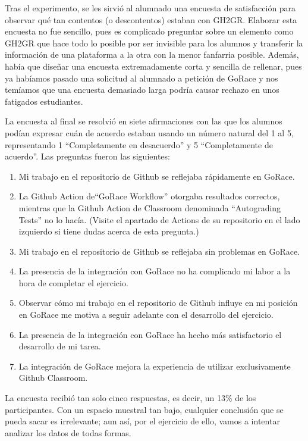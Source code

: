 Tras el experimento, se les sirvió al alumnado una encuesta de satisfacción para observar qué tan contentos (o descontentos) estaban con GH2GR. Elaborar esta encuesta no fue sencillo, pues es complicado preguntar sobre un elemento como GH2GR que hace todo lo posible por ser invisible para los alumnos y transferir la información de una plataforma a la otra con la menor fanfarria posible. Además, había que diseñar una encuesta extremadamente corta y sencilla de rellenar, pues ya habíamos pasado una solicitud al alumnado a petición de GoRace y nos temíamos que una encuesta demasiado larga podría causar rechazo en unos fatigados estudiantes.

La encuesta al final se resolvió en siete afirmaciones con las que los alumnos podían expresar cuán de acuerdo estaban usando un número natural del 1 al 5, representando 1 ``Completamente en desacuerdo'' y 5 ``Completamente de acuerdo''. Las preguntas fueron las siguientes:
\begin{enumerate}
    \item Mi trabajo en el repositorio de Github se reflejaba rápidamente en GoRace.
    \item La Github Action de``GoRace Workflow'' otorgaba resultados correctos, mientras que la Github Action de Classroom denominada ``Autograding Tests'' no lo hacía. (Visite el apartado de Actions de su repositorio en el lado izquierdo si tiene dudas acerca de esta pregunta.)
    \item Mi trabajo en el repositorio de Github se reflejaba sin problemas en GoRace.
    \item La presencia de la integración con GoRace no ha complicado mi labor a la hora de completar el ejercicio.
    \item Observar cómo mi trabajo en el repositorio de Github influye en mi posición en GoRace me motiva a seguir adelante con el desarrollo del ejercicio.
    \item La presencia de la integración con GoRace ha hecho más satisfactorio el desarrollo de mi tarea.
    \item La integración de GoRace mejora la experiencia de utilizar exclusivamente Github Classroom.
\end{enumerate}

La encuesta recibió tan solo cinco respuestas, es decir, un 13\% de los participantes. Con un espacio muestral tan bajo, cualquier conclusión que se pueda sacar es irrelevante; aun así, por el ejercicio de ello, vamos a intentar analizar los datos de todas formas.

